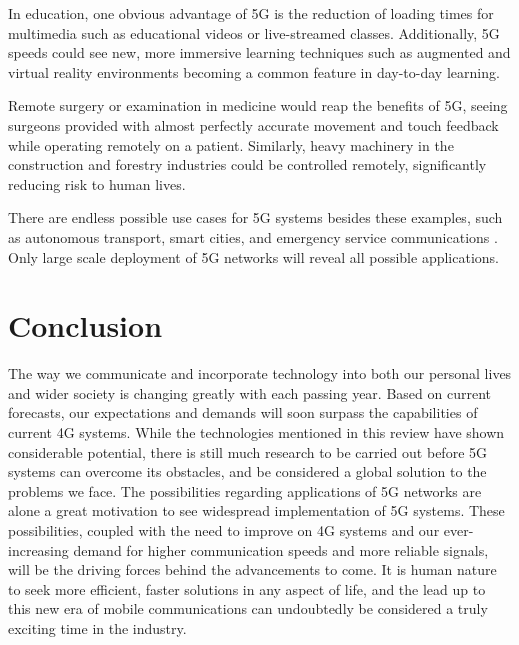 \documentclass[journal]{IEEEtran}
\begin{document}
In education, one obvious advantage of 5G is the reduction of loading times for multimedia such as educational videos or live-streamed classes. Additionally, 5G speeds could see new, more immersive learning techniques such as augmented and virtual reality environments becoming a common feature in day-to-day learning.

Remote surgery or examination in medicine would reap the benefits of 5G, seeing surgeons provided with almost perfectly accurate movement and touch feedback while operating remotely on a patient. \cite{wp5g} Similarly, heavy machinery in the construction and forestry industries could be controlled remotely, significantly reducing risk to human lives.

There are endless possible use cases for 5G systems besides these examples, such as autonomous transport, smart cities, and emergency service communications \cite{wp5g}. Only large scale deployment of 5G networks will reveal all possible applications.

\section{Conclusion}
The way we communicate and incorporate technology into both our personal lives and wider society is changing greatly with each passing year. Based on current forecasts, our expectations and demands will soon surpass the capabilities of current 4G systems. While the technologies mentioned in this review have shown considerable potential, there is still much research to be carried out before 5G systems can overcome its obstacles, and be considered a global solution to the problems we face. The possibilities regarding applications of 5G networks are alone a great motivation to see widespread implementation of 5G systems. These possibilities, coupled with the need to improve on 4G systems and our ever-increasing demand for higher communication speeds and more reliable signals, will be the driving forces behind the advancements to come. It is human nature to seek more efficient, faster solutions in any aspect of life, and the lead up to this new era of mobile communications can undoubtedly be considered a truly exciting time in the industry.

\printbibliography
\end{document}
